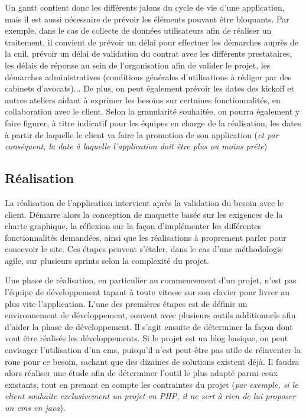 Un \gls{gantt} contient donc les différents jalons du cycle de vie d'une application, mais il est aussi nécessaire de prévoir les éléments pouvant être bloquants. Par exemple, dans le cas de collecte de données utilisateurs afin de réaliser un traitement, il convient de prévoir un délai pour effectuer les démarches auprès de la \gls{cnil}, prévoir un délai de validation du contrat avec les différents prestataires, les délais de réponse au sein de l'organisation afin de valider le projet, les démarches administratives (conditions générales d'utilisations à rédiger par des cabinets d'avocats)... De plus, on peut également prévoir les dates des \gls{kickoff} et autres ateliers aidant à exprimer les besoins sur certaines fonctionnalités, en collaboration avec le client. Selon la granularité souhaitée, on pourra également y faire figurer, à titre indicatif pour les équipes en charge de la réalisation, les dates à partir de laquelle le client va faire la promotion de son application (\emph{et par conséquent, la date à laquelle l'application doit être plus ou moins prête})

\subsection{Réalisation}

La réalisation de l'application intervient après la validation du besoin avec le client. Démarre alors la conception de maquette basée sur les exigences de la charte graphique, la réflexion sur la façon d'implémenter les différentes fonctionnalités demandées, ainsi que les réalisations à proprement parler pour concevoir le site. Ces étapes peuvent s'étaler, dans le cas d'une méthodologie agile, sur plusieurs sprints selon la complexité du projet.

Une phase de réalisation, en particulier au commencement d'un projet, n'est pas l'équipe de développement tapant à toute vitesse sur son clavier pour livrer au plus vite l'application. L'une des premières étapes est de définir un environnement de développement, souvent avec plusieurs outils additionnels afin d'aider la phase de développement. Il s'agit ensuite de déterminer la façon dont vont être réalisés les développements. Si le projet est un blog basique, on peut envisager l'utilisation d'un \gls{cms}, puisqu'il n'est peut-être pas utile de réinventer la roue pour ce besoin, sachant que des dizaines de solutions existent déjà. Il faudra alors réaliser une étude afin de déterminer l'outil le plus adapté parmi ceux existants, tout en prenant en compte les contraintes du projet (\emph{par exemple, si le client souhaite exclusivement un projet en \gls{PHP}, il ne sert à rien de lui proposer un \gls{cms} en java}).

